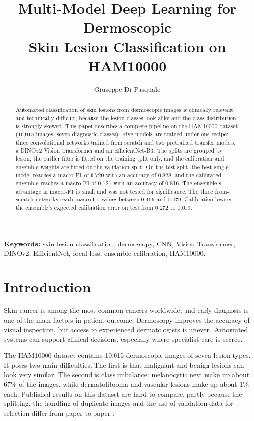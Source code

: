 \documentclass[10pt,twocolumn]{article}
\title{%
  \large\textbf{Multi-Model Deep Learning for Dermoscopic\\
  Skin Lesion Classification on HAM10000}
}
\author[1]{Giuseppe Di Pasquale}
\date{}
\begin{document}
\maketitle
\thispagestyle{empty}

\begin{abstract}
Automated classification of skin lesions from dermoscopic images is clinically relevant and technically difficult, because the lesion classes look alike and the class distribution is strongly skewed. This paper describes a complete pipeline on the HAM10000 dataset (10,015 images, seven diagnostic classes). Five models are trained under one recipe: three convolutional networks trained from scratch and two pretrained transfer models, a DINOv2 Vision Transformer and an EfficientNet-B3. The splits are grouped by lesion, the outlier filter is fitted on the training split only, and the calibration and ensemble weights are fitted on the validation split. On the test split, the best single model reaches a macro-F1 of 0.720 with an accuracy of 0.828, and the calibrated ensemble reaches a macro-F1 of 0.727 with an accuracy of 0.816. The ensemble's advantage in macro-F1 is small and was not tested for significance. The three from-scratch networks reach macro-F1 values between 0.469 and 0.479. Calibration lowers the ensemble's expected calibration error on test from 0.272 to 0.019.
\end{abstract}

\noindent\textbf{Keywords:} skin lesion classification, dermoscopy, CNN, Vision Transformer, DINOv2, EfficientNet, focal loss, ensemble calibration, HAM10000.

\section{Introduction}
\label{sec:intro}

Skin cancer is among the most common cancers worldwide, and early diagnosis is one of the main factors in patient outcome. Dermoscopy improves the accuracy of visual inspection, but access to experienced dermatologists is uneven. Automated systems can support clinical decisions, especially where specialist care is scarce.

The HAM10000 dataset \cite{tschandl2018ham10000} contains 10,015 dermoscopic images of seven lesion types. It poses two main difficulties. The first is that malignant and benign lesions can look very similar. The second is class imbalance: melanocytic nevi make up about 67\% of the images, while dermatofibroma and vascular lesions make up about 1\% each. Published results on this dataset are hard to compare, partly because the splitting, the handling of duplicate images and the use of validation data for selection differ from paper to paper \cite{cassidy2022,abhishek2024}.
\end{document}
